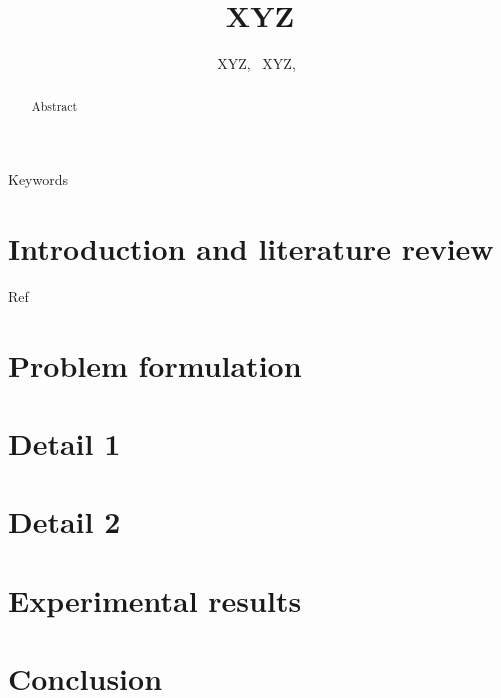 \documentclass[journal]{IEEEtran}
\begin{document}
\title{XYZ}
\author{XYZ,~
	XYZ,~}%
\vspace{-0.5cm}

\maketitle

\begin{abstract}
Abstract
\end{abstract}

\begin{IEEEkeywords}
Keywords
\end{IEEEkeywords}

\IEEEpeerreviewmaketitle

\section{Introduction and literature review}
\label{sec:intro}
Ref \cite{xyz}

\section{Problem formulation}
\label{PF}


\section{Detail 1}
\label{PA:DP}



\section{Detail 2}
\label{SP}

\section{Experimental results}
\label{sec:ER}


\section{Conclusion}
\label{Conclusion}




\vspace{-1cm}
\end{document}

